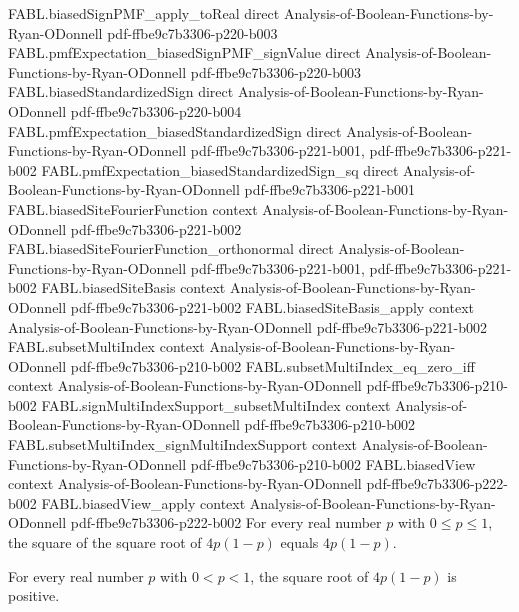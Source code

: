 \begin{theorem}
\proofstep
  {FABL.biasedSignPMF_apply_toReal}
  {direct}
  {Analysis-of-Boolean-Functions-by-Ryan-ODonnell}
  {pdf-ffbe9c7b3306-p220-b003}
\proofstep
  {FABL.pmfExpectation_biasedSignPMF_signValue}
  {direct}
  {Analysis-of-Boolean-Functions-by-Ryan-ODonnell}
  {pdf-ffbe9c7b3306-p220-b003}
\proofstep
  {FABL.biasedStandardizedSign}
  {direct}
  {Analysis-of-Boolean-Functions-by-Ryan-ODonnell}
  {pdf-ffbe9c7b3306-p220-b004}
\proofstep
  {FABL.pmfExpectation_biasedStandardizedSign}
  {direct}
  {Analysis-of-Boolean-Functions-by-Ryan-ODonnell}
  {pdf-ffbe9c7b3306-p221-b001,
    pdf-ffbe9c7b3306-p221-b002}
\proofstep
  {FABL.pmfExpectation_biasedStandardizedSign_sq}
  {direct}
  {Analysis-of-Boolean-Functions-by-Ryan-ODonnell}
  {pdf-ffbe9c7b3306-p221-b001}
\proofstep
  {FABL.biasedSiteFourierFunction}
  {context}
  {Analysis-of-Boolean-Functions-by-Ryan-ODonnell}
  {pdf-ffbe9c7b3306-p221-b002}
\proofstep
  {FABL.biasedSiteFourierFunction_orthonormal}
  {direct}
  {Analysis-of-Boolean-Functions-by-Ryan-ODonnell}
  {pdf-ffbe9c7b3306-p221-b001,
    pdf-ffbe9c7b3306-p221-b002}
\proofstep
  {FABL.biasedSiteBasis}
  {context}
  {Analysis-of-Boolean-Functions-by-Ryan-ODonnell}
  {pdf-ffbe9c7b3306-p221-b002}
\proofstep
  {FABL.biasedSiteBasis_apply}
  {context}
  {Analysis-of-Boolean-Functions-by-Ryan-ODonnell}
  {pdf-ffbe9c7b3306-p221-b002}
\proofstep
  {FABL.subsetMultiIndex}
  {context}
  {Analysis-of-Boolean-Functions-by-Ryan-ODonnell}
  {pdf-ffbe9c7b3306-p210-b002}
\proofstep
  {FABL.subsetMultiIndex_eq_zero_iff}
  {context}
  {Analysis-of-Boolean-Functions-by-Ryan-ODonnell}
  {pdf-ffbe9c7b3306-p210-b002}
\proofstep
  {FABL.signMultiIndexSupport_subsetMultiIndex}
  {context}
  {Analysis-of-Boolean-Functions-by-Ryan-ODonnell}
  {pdf-ffbe9c7b3306-p210-b002}
\proofstep
  {FABL.subsetMultiIndex_signMultiIndexSupport}
  {context}
  {Analysis-of-Boolean-Functions-by-Ryan-ODonnell}
  {pdf-ffbe9c7b3306-p210-b002}
\proofstep
  {FABL.biasedView}
  {context}
  {Analysis-of-Boolean-Functions-by-Ryan-ODonnell}
  {pdf-ffbe9c7b3306-p222-b002}
\proofstep
  {FABL.biasedView_apply}
  {context}
  {Analysis-of-Boolean-Functions-by-Ryan-ODonnell}
  {pdf-ffbe9c7b3306-p222-b002}
For every real number $p$ with $0\le p\le1$, the square of the square root of $4p(1-p)$
equals $4p(1-p)$.
\end{theorem}

\begin{theorem}
\label{FABL.biasSigma_pos}
\leanok
{}
For every real number $p$ with $0<p<1$, the square root of $4p(1-p)$ is positive.
\end{theorem}

